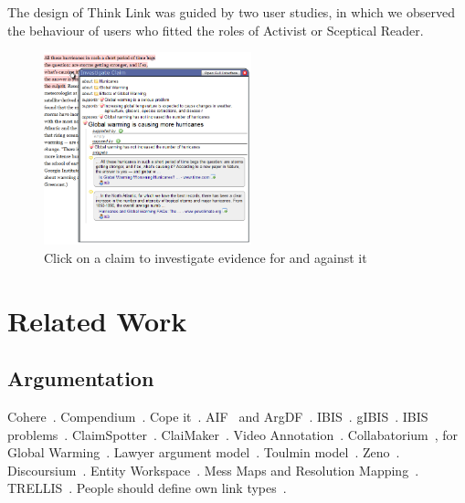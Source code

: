 \documentclass{chi2009}
\begin{document}
The design of Think Link was guided by two user studies, in which we observed the behaviour of users who fitted the roles of Activist or Sceptical Reader. 

\begin{figure}[tb]
	\begin{center}
	\includegraphics[width=6cm]{../screenshots/claim_popup_crop2.png}
	\caption{Click on a claim to investigate evidence for and against it}
	\label{claimview}
	\end{center}
\end{figure}



\section{Related Work}

\subsection{Argumentation}

Cohere~\cite{Shum2008}. Compendium~\cite{Selvin2001}. Cope it~\cite{Karacapilidis2001}. AIF~\cite{McGinnis2007} and ArgDF~\cite{Rahwan2007}. IBIS~\cite{Rittel1973}. gIBIS~\cite{Conklin1987}. IBIS problems~\cite{Isenmann1997}. ClaimSpotter~\cite{Sereno2005,Sereno2004}. ClaiMaker~\cite{Uren2003}. Video Annotation~\cite{Diakopoulos2008}. Collabatorium~\cite{Klein2007}, for Global Warming~\cite{Malone2007}. Lawyer argument model~\cite{Verheij1999}. Toulmin model~\cite{Toulmin1958}. Zeno~\cite{Gordon1997}. Discoursium~\cite{Yetim2007}.
Entity Workspace~\cite{Billman2007}. 
Mess Maps and Resolution Mapping~\cite{Horn2007}.
TRELLIS~\cite{Chklovski2005}.  
People should define own link types~\cite{Wang1998}.
\end{document}
